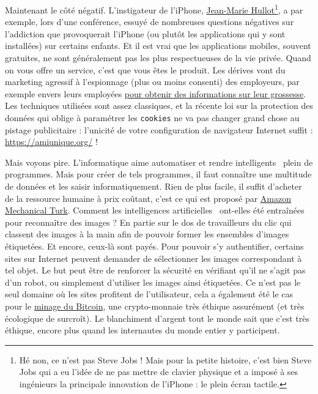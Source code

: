 \documentclass[10pt]{article}
\begin{document}
Maintenant le côté négatif. L'instigateur de l'iPhone, \href{https://fr.wikipedia.org/wiki/Jean-Marie_Hullot}{Jean-Marie Hullot}\footnote{
  Hé non, ce n'est pas Steve Jobs ! Mais pour la petite histoire, c'est bien Steve Jobs qui a eu l'idée de ne pas mettre de clavier physique
  et a imposé à ses ingénieurs la principale innovation de l'iPhone : le plein écran tactile.
}, a par exemple, lors d'une conférence, essuyé de nombreuses questions négatives sur l'addiction que provoquerait l'iPhone
(ou plutôt les applications qui y sont installées) sur certains enfants. Et il est vrai que les applications mobiles, souvent gratuites,
ne sont généralement pas les plus respectueuses de la vie privée. Quand on vous offre un service, c'est que vous êtes le produit.
Les dérives vont du marketing agressif à l'espionnage (plus ou moins consenti) des employeurs, par exemple envers leurs employées
\href{https://www.lemonde.fr/pixels/article/2019/04/12/aux-etats-unis-des-employeurs-font-main-basse-sur-les-donnees-des-applications-de-grossesse_5449283_4408996.html}{pour obtenir des informations sur leur grossesse}.
Les techniques utilisées sont assez classiques, et la récente loi sur la protection des données qui oblige à paramétrer les \texttt{cookies}
ne va pas changer grand chose au pistage publicitaire : l'unicité de votre configuration de navigateur Internet suffit :
\url{https://amiunique.org/} !


Mais voyons pire. L'informatique aime automatiser et rendre \og intelligents \fg~plein de programmes. Mais pour créer de tels programmes,
il faut connaître une multitude de données et les saisir informatiquement. Rien de plus facile, il suffit
d'acheter de la ressource humaine à prix coûtant, c'est ce qui est proposé par \href{https://www.mturk.com/}{Amazon Mechanical Turk}.
Comment les intelligences \og artificielles \fg~ont-elles été entraînées pour reconnaître des images ?
En partie sur le dos de travailleurs du clic qui classent des images à la main afin de pouvoir former les ensembles d'images étiquetées.
Et encore, ceux-là sont payés. Pour pouvoir s'y authentifier, certains sites sur Internet peuvent demander de sélectionner les images correspondant à tel objet.
Le but peut être de renforcer la sécurité en vérifiant qu'il ne s'agit pas d'un robot, ou simplement d'utiliser les images ainsi étiquetées.
Ce n'est pas le seul domaine où les sites profitent de l'utilisateur, cela a également été le cas pour le
\href{https://www.lemonde.fr/pixels/article/2018/01/31/ces-logiciels-qui-utilisent-votre-ordinateur-pour-fabriquer-des-cryptomonnaies_5249816_4408996.html}{minage du Bitcoin},
une crypto-monnaie très éthique assurément (et très écologique de surcroît).
Le blanchiment d'argent tout le monde sait que c'est très éthique, encore plus quand les internautes du monde entier y participent.
\end{document}
